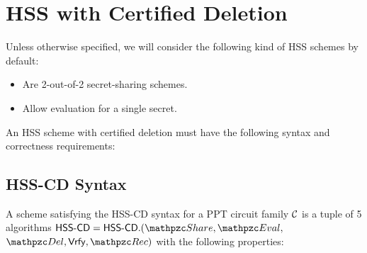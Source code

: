 \section{HSS with Certified Deletion}\label{sec:hss-cd}

Unless otherwise specified, we will consider the following kind of
HSS schemes by default:
\begin{itemize}
\item Are 2-out-of-2 secret-sharing schemes.
\item Allow evaluation for a single secret.
\end{itemize}

An HSS scheme with certified deletion must have the following syntax
and correctness requirements:

\subsection{HSS-CD Syntax}
A scheme satisfying the HSS-CD syntax for a PPT circuit family
$\mathcal{C}$ is a tuple of 5 algorithms $\HSScd = \HSScd.(\Sh, \Ev,$
$\Del, \Vrfy, \Rec)$ with the following properties:

